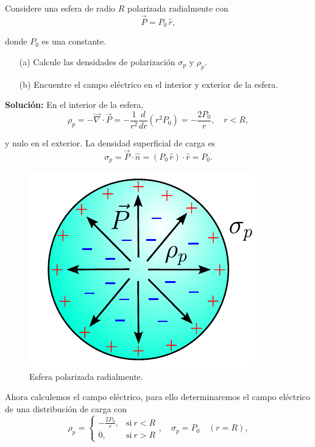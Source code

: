 \begin{ejemplo}
    Considere una esfera de radio $R$ polarizada radialmente con
    $$\Vec{P} = P_0 \,\hat{r},$$

    donde $P_0$ es una constante.
    \begin{itemize}
        \item[(a)] Calcule las densidades de polarización $\sigma_p$ y $\rho_p$.

        \item[(b)] Encuentre el campo eléctrico en el interior y exterior de la esfera.
    \end{itemize}
    
    \textbf{Solución:} En el interior de la esfera, 
    $$\rho_p = - \Vec{\nabla} \cdot \Vec{P} = - \frac{1}{r^2} \frac{d}{dr}(r^2 P_0) = - \frac{2P_0}{r}, \quad r < R,$$

    y nulo en el exterior. La densidad superficial de carga es
    $$\sigma_p = \Vec{P} \cdot \hat{n} = ( P_0 \,\hat{r}) \cdot \hat{r} = P_0.$$

     \begin{figure}[H]
        \centering
        \includegraphics[scale = 0.65]{Figuras/Ej-Polarizacion.pdf}
        \caption{Esfera polarizada radialmente.}
        \label{fig:Esfera-Polarizada-Radial}
    \end{figure}

    Ahora calculemos el campo eléctrico, para ello determinaremos el campo eléctrico de una distribución de carga con 
    $$\rho_p = \left\{\begin{array}{cl}
        -\frac{2P_0}{r}, & \mbox{si} ~ r < R  \\
        0, & \mbox{si} ~ r > R  
    \end{array} \right., \quad \sigma_p = P_0 \quad (r = R),$$


\end{ejemplo}
